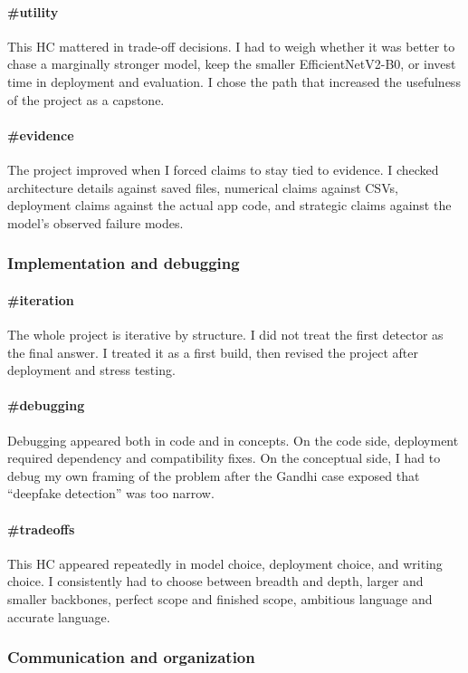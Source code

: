 \documentclass[11pt]{article}
\begin{document}
\paragraph{\#utility}
This HC mattered in trade-off decisions. I had to weigh whether it was better to chase a marginally stronger model, keep the smaller EfficientNetV2-B0, or invest time in deployment and evaluation. I chose the path that increased the usefulness of the project as a capstone.

\paragraph{\#evidence}
The project improved when I forced claims to stay tied to evidence. I checked architecture details against saved files, numerical claims against CSVs, deployment claims against the actual app code, and strategic claims against the model's observed failure modes.

\subsubsection*{Implementation and debugging}
\paragraph{\#iteration}
The whole project is iterative by structure. I did not treat the first detector as the final answer. I treated it as a first build, then revised the project after deployment and stress testing.

\paragraph{\#debugging}
Debugging appeared both in code and in concepts. On the code side, deployment required dependency and compatibility fixes. On the conceptual side, I had to debug my own framing of the problem after the Gandhi case exposed that ``deepfake detection'' was too narrow.

\paragraph{\#tradeoffs}
This HC appeared repeatedly in model choice, deployment choice, and writing choice. I consistently had to choose between breadth and depth, larger and smaller backbones, perfect scope and finished scope, ambitious language and accurate language.

\subsubsection*{Communication and organization}
\end{document}
